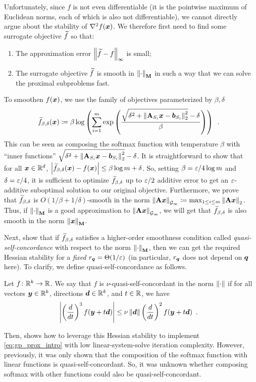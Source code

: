 Unfortunately, since $f$ is not even differentiable (it is the pointwise maximum of Euclidean norms, each of which is also not differentiable), we cannot directly argue about the stability of $\nabla^2 f(\bm{x})$. We therefore first need to find some surrogate objective $\widetilde{f}$ so that:
\begin{enumerate}
    \item The approximation error $\left\lVert \widetilde{f} -f \right\rVert_{\infty}$ is small;
    \item The surrogate objective $\widetilde{f}$ is smooth in $\left\lVert \cdot \right\rVert_{\mathbf{M}}$ in such a way that we can solve the proximal subproblems fast.
\end{enumerate}
To smoothen $f(\bm{x})$, we use the family of objectives parameterized by $\beta,\delta$
\begin{align}
    \widetilde{f}_{\beta,\delta}(\bm{x}) \coloneqq \beta\log\left(\sum_{i=1}^m \mathrm{exp}\left(\frac{\sqrt{\delta^2 + \left\lVert \mathbf{A}_{S_i}\bm{x}-\bm{b}_{S_i} \right\rVert_2^2}-\delta}{\beta}\right)\right)\enspace.\label{eq:intro_smooth_fair_objective}
\end{align}
This can be seen as composing the softmax function with temperature $\beta$ with ``inner functions'' $\sqrt{\delta^2 + \left\lVert \mathbf{A}_{S_i}\bm{x}-\bm{b}_{S_i} \right\rVert_2^2} - \delta$. It is straightforward to show that for all $\bm{x}\in\mathbb{R}^d$, $\left\lvert \widetilde{f}_{\beta,\delta}(\bm{x}) - f(\bm{x}) \right\rvert \le \beta\log m + \delta$. So, setting $\beta = \varepsilon/4\log m$ and $\delta = \varepsilon/4$, it is sufficient to optimize $\widetilde{f}_{\beta,\delta}$ up to $\varepsilon/2$ additive error to get an $\varepsilon$-additive suboptimal solution to our original objective. Furthermore, we prove that $\widetilde{f}_{\beta,\delta}$ is $O(1/\beta+1/\delta)$-smooth in the norm $\left\lVert \mathbf{A}\bm{x} \right\rVert_{\mathcal{G}_{\infty}} \coloneqq \max_{1 \le i \le m} \left\lVert \mathbf{A}\bm{x} \right\rVert_2$. Thus, if $\left\lVert \cdot \right\rVert_{\mathbf{M}}$ is a good approximation to $\left\lVert \mathbf{A}\bm{x} \right\rVert_{\mathcal{G}_{\infty}}$, we will get that $\widetilde{f}_{\beta,\delta}$ is also smooth in the norm $\left\lVert \bm{x} \right\rVert_{\mathbf{M}}$.

Next, \citet{msbacon} show that if $\widetilde{f}_{\beta,\delta}$ satisfies a higher-order smoothness condition called \textit{quasi-self-concordance} with respect to the norm $\left\lVert \cdot \right\rVert_{\mathbf{M}}$, then we can get the required Hessian stability for a \textit{fixed} $r_{\bm{q}} = \Theta(1/\varepsilon)$ (in particular, $r_{\bm{q}}$ does not depend on $\bm{q}$ here). To clarify, we define quasi-self-concordance as follows.
\begin{definition}
\label{defn:qsc}
Let $f\colon\mathbb{R}^k\rightarrow\mathbb{R}$. We say that $f$ is $\nu$-quasi-self-concordant in the norm $\left\lVert \cdot \right\rVert$ if for all vectors $\bm{y}\in\mathbb{R}^k$, directions $\bm{d}\in\mathbb{R}^k$, and $t\in\mathbb{R}$, we have
\begin{align*}
    \left\lvert \left(\frac{d}{dt}\right)^3 f(\bm{y}+t\bm{d}) \right\rvert \le \nu\left\lVert \bm{d} \right\rVert\left(\frac{d}{dt}\right)^2 f(\bm{y}+t\bm{d})\enspace.
\end{align*}
\end{definition}
Then, \cite{msbacon} shows how to leverage this Hessian stability to implement \eqref{eq:gp_prox_intro} with low linear-system-solve iteration complexity. However, previously, it was only shown that the composition of the softmax function with linear functions is quasi-self-concordant. So, it was unknown whether composing softmax with other functions could also be quasi-self-concordant. 

